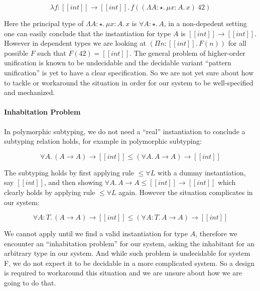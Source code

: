 \begin{equation*}
    \lambda f : [[int]] \rightarrow [[int]].\, f ((\Lambda A : \star.\,\mu x : A.\, x)~42)
\end{equation*}

Here the principal type of $\Lambda A : \star.\,\mu x : A.\, x$ is $\forall A : \star.\, A$,
in a non-depedent setting one can easily conclude that the instantiation for type $A$
is $[[int]] \rightarrow [[int]]$. However in dependent types we are looking at
$(\Pi n : [[int]].\, F(n))$ for all possible $F$ such that $F(42) = [[int]]$.
The general problem of higher-order unification is known to be undecidable\cite{goldfarb1981undecidability}
and the decidable variant ``pattern unification''\cite{miller1991unification}
is yet to have a clear specification.
So we are not yet sure about how to tackle or workaround the situation in order
for our system to be well-specified and mechanized.

\paragraph{Inhabitation Problem}

In polymorphic subtyping, we do not need a ``real'' instantiation to conclude
a subtyping relation holds, for example in polymorphic subtyping:

\begin{equation*}
    \forall A.\, (A \rightarrow A) \rightarrow [[int]] \le (\forall A.\, A \rightarrow A) \rightarrow [[int]]
\end{equation*}

The subtyping holds by first applying rule $\le\forall L$ with a dummy instantiation,
say $[[int]]$, and then showing $\forall A.\, A \rightarrow A \le [[int]] \rightarrow [[int]]$
which clearly holds by applying rule $\le\forall L$ again. However the situation
complicates in our system:

\begin{equation*}
    \forall A : T.\, (A \rightarrow A) \rightarrow [[int]] \le (\forall A : T.\, A \rightarrow A) \rightarrow [[int]]
\end{equation*}

We cannot apply  until we find a valid instantiation for type $A$,
therefore we encounter an ``inhabitation problem'' for our system, asking the
inhabitant for an arbitrary type in our system. And while such problem is
undecidable for system F\cite{dudenhefner2019simpler}, we do not expect it to be
decidable in a more complicated system. So a design is required to workaround
this situation and we are unsure about how we are going to do that.
